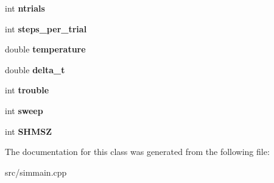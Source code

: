 \begin{DoxyCompactItemize}
\item 
int {\bfseries ntrials}\hypertarget{classGCHMCIntegrator_a60ad501a60a7d798c9d8ec83a7c5087d}{}\label{classGCHMCIntegrator_a60ad501a60a7d798c9d8ec83a7c5087d}

\item 
int {\bfseries steps\+\_\+per\+\_\+trial}\hypertarget{classGCHMCIntegrator_a2e1cfdc645b8bed733ddc0694646779a}{}\label{classGCHMCIntegrator_a2e1cfdc645b8bed733ddc0694646779a}

\item 
double {\bfseries temperature}\hypertarget{classGCHMCIntegrator_af45d5b6c9e3b69be16412330c54186d2}{}\label{classGCHMCIntegrator_af45d5b6c9e3b69be16412330c54186d2}

\item 
double {\bfseries delta\+\_\+t}\hypertarget{classGCHMCIntegrator_a34a45de947a295da0f95ff5c3e414ade}{}\label{classGCHMCIntegrator_a34a45de947a295da0f95ff5c3e414ade}

\item 
int {\bfseries trouble}\hypertarget{classGCHMCIntegrator_a508ec016398bcd526e00bf8f209ba0db}{}\label{classGCHMCIntegrator_a508ec016398bcd526e00bf8f209ba0db}

\item 
int {\bfseries sweep}\hypertarget{classGCHMCIntegrator_a732a9e0fda0a6608eae84e5ec4e1d193}{}\label{classGCHMCIntegrator_a732a9e0fda0a6608eae84e5ec4e1d193}

\item 
int {\bfseries S\+H\+M\+SZ}\hypertarget{classGCHMCIntegrator_a437bd1a1a494f278a1bc41e3a754eac1}{}\label{classGCHMCIntegrator_a437bd1a1a494f278a1bc41e3a754eac1}

\end{DoxyCompactItemize}


The documentation for this class was generated from the following file\+:\begin{DoxyCompactItemize}
\item 
src/simmain.\+cpp\end{DoxyCompactItemize}
